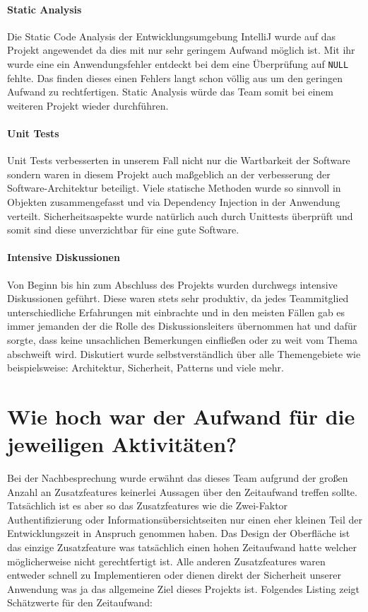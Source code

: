 \documentclass[12pt,DIV14,BCOR10mm,a4paper,parskip=half-,headsepline,headinclude,english,ngerman,bibliography=totocnumbered]{scrreprt}
\begin{document}
\paragraph{Static Analysis} Die Static Code Analysis der Entwicklungsumgebung IntelliJ wurde auf das Projekt angewendet da dies mit nur sehr geringem Aufwand möglich ist. Mit ihr wurde eine ein Anwendungsfehler entdeckt bei dem eine Überprüfung auf \texttt{NULL} fehlte. Das finden dieses einen Fehlers langt schon völlig aus um den geringen Aufwand zu rechtfertigen. Static Analysis würde das Team somit bei einem weiteren Projekt wieder durchführen.

\paragraph{Unit Tests} Unit Tests verbesserten in unserem Fall nicht nur die Wartbarkeit der Software sondern waren in diesem Projekt auch maßgeblich an der verbesserung der Software-Architektur beteiligt. Viele statische Methoden wurde so sinnvoll in Objekten zusammengefasst und via Dependency Injection in der Anwendung verteilt. Sicherheitsaspekte wurde natürlich auch durch Unittests überprüft und somit sind diese unverzichtbar für eine gute Software.

\paragraph{Intensive Diskussionen} Von Beginn bis hin zum Abschluss des Projekts wurden durchwegs intensive Diskussionen geführt. Diese waren stets sehr produktiv, da jedes Teammitglied unterschiedliche Erfahrungen mit einbrachte und in den meisten Fällen gab es immer jemanden der die Rolle des Diskussionsleiters übernommen hat und dafür sorgte, dass keine unsachlichen Bemerkungen einfließen oder zu weit vom Thema abschweift wird. Diskutiert wurde selbstverständlich über alle Themengebiete wie beispielsweise: Architektur, Sicherheit, Patterns und viele mehr.

\section{Wie hoch war der Aufwand für die jeweiligen Aktivitäten?}
Bei der Nachbesprechung wurde erwähnt das dieses Team aufgrund der großen Anzahl an Zusatzfeatures keinerlei Aussagen über den Zeitaufwand treffen sollte. Tatsächlich ist es aber so das Zusatzfeatures wie die Zwei-Faktor Authentifizierung oder Informationsübersichtseiten nur einen eher kleinen Teil der Entwicklungszeit in Anspruch genommen haben. Das Design der Oberfläche ist das einzige Zusatzfeature was tatsächlich einen hohen Zeitaufwand hatte welcher möglicherweise nicht gerechtfertigt ist. Alle anderen Zusatzfeatures waren entweder schnell zu Implementieren oder dienen direkt der Sicherheit unserer Anwendung was ja das allgemeine Ziel dieses Projekts ist. Folgendes Listing zeigt Schätzwerte für den Zeitaufwand:
\end{document}
